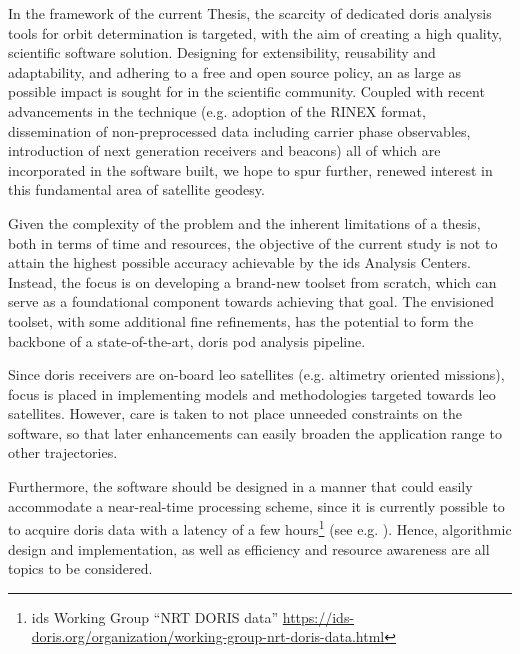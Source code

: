 In the framework of the current Thesis, the scarcity of dedicated \gls{doris}
analysis tools for orbit determination is targeted, with the aim of creating
a high quality, scientific software solution. Designing for extensibility, 
reusability and adaptability, and adhering to a free and open source policy, an 
as large as possible impact is sought for in the scientific community. Coupled 
with recent advancements in the technique (e.g. adoption of the RINEX format, 
dissemination of non-preprocessed data including carrier phase observables, 
introduction of next generation receivers and beacons) all of which are 
incorporated in the software built, we hope to spur further, renewed interest 
in this fundamental area of satellite geodesy.

\iffalse
Due to the complexity of the problem and the limitations inherent in a Thesis 
(both in time and resources), the objective of the current study is not to match 
the highest possible accuracy, currently delivered by the \gls{ids} Analysis 
Centers. However, the aim is to built a brand new toolset, from scratch, to act as 
a building block towards this end. A toolset that augmented with some fine 
refinements can be the backbone of a state-of-the-art, \gls{doris} \gls{pod} 
analysis pipeline.
\fi
Given the complexity of the problem and the inherent limitations of a thesis, both in
terms of time and resources, the objective of the current study is not to attain the
highest possible accuracy achievable by the \gls{ids} Analysis Centers. Instead, the
focus is on developing a brand-new toolset from scratch, which can serve as a
foundational component towards achieving that goal. The envisioned toolset, with
some additional fine refinements, has the potential to form the backbone of a
state-of-the-art, \gls{doris} \gls{pod} analysis pipeline.

Since \gls{doris} receivers are on-board \gls{leo} satellites (e.g. altimetry 
oriented missions), focus is placed in implementing models and methodologies 
targeted towards \gls{leo} satellites. However, care is taken to not place 
unneeded constraints on the software, so that later enhancements can easily 
broaden the application range to other trajectories.

Furthermore, the software should be designed in a manner that could easily 
accommodate a near-real-time processing scheme, since it is currently possible to 
to acquire \gls{doris} data with a latency of a few hours\footnote{\gls{ids} Working Group ``NRT DORIS data'' \url{https://ids-doris.org/organization/working-group-nrt-doris-data.html}} (see e.g. \cite{Wang2022}).
Hence, algorithmic design and implementation, as well as efficiency and resource 
awareness are all topics to be considered.

